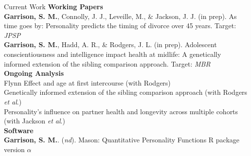 \documentclass {resume}
\newcommand{\R}{\textup{\textrm{R}}\xspace}
\newcommand{\meb}{{\bf Garrison, S. M.}\xspace}
\newcommand{\et}{\textit{et al}.\xspace}
\begin{document}
\begin{rSection}{\textrm{Current Work}}
{\large {\bf Working Papers}}\\
\meb, Connolly, J. J., Leveille, M., \& Jackson, J. J. (in prep). As time goes by: Personality predicts the \hspace* {6 mm}timing of divorce over 45 years. Target: \textit{JPSP}\smallskip\\
\meb, Hadd, A. R., \& Rodgers, J. L. (in prep). Adolescent conscientiousness and intelligence impact \hspace* {6 mm}health at midlife: A genetically informed extension of the sibling comparison approach. Target: \textit{MBR}%
\medskip\\{\large {\bf Ongoing Analysis}}\\
Flynn Effect and age at first intercourse (with Rodgers)\smallskip\\
Genetically informed extension of the sibling comparison approach (with Rodgers \et)\smallskip\\
Personality's influence on partner health and longevity across multiple cohorts (with Jackson \et)
\medskip\\{\large {\bf Software}}\\
\meb. (\textit{nd}). Mason: Quantitative Personality Functions \R package version $\alpha$ %
\end{rSection}
\end{document}

